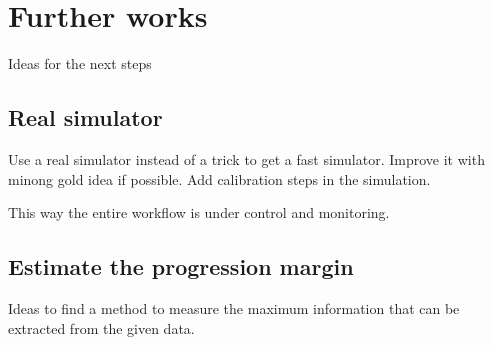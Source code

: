 \section{Further works} %
\label{sec:further_works}

Ideas for the next steps

\subsection{Real simulator} %
\label{sub:real_simulator}

Use a real simulator instead of a trick to get a fast simulator.
Improve it with minong gold idea if possible.
Add calibration steps in the simulation.

This way the entire workflow is under control and monitoring.



\subsection{Estimate the progression margin} %
\label{sub:estimate_the_progression_margin}

Ideas to find a method to measure the maximum information that can be extracted from the given data.







